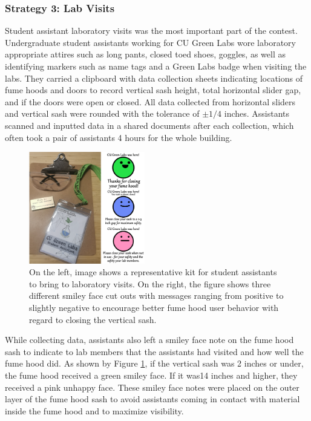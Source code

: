 \documentclass[12pt, twocolumn]{article}
\begin{document}
\subsubsection*{Strategy 3: Lab Visits}\label{Sec:Strategy3}
 Student assistant laboratory visits was the most important part of the contest. Undergraduate student assistants working for CU Green Labs wore laboratory appropriate attires such as long pants, closed toed shoes, goggles, as well as identifying markers such as name tags and a Green Labs badge when visiting the labs. They carried a clipboard with data collection sheets indicating locations of fume hoods and doors to record vertical sash height, total horizontal slider gap, and if the doors were open or closed. All data collected from horizontal sliders and vertical sash were rounded with the tolerance of $\pm 1/4$ inches. Assistants scanned and inputted data in a shared documents after each collection, which often took a pair of assistants 4 hours for the whole building. 

\begin{figure}[ht]	
	\centering
	\includegraphics[width=0.45\textwidth]{Images/Contest_ClipboardAndSmiley.png}
	\caption{On the left, image shows a  representative kit for student assistants to bring to laboratory visits. On the right, the figure shows three different smiley face cut outs with messages ranging from positive to slightly negative to encourage better fume hood user behavior with regard to closing the vertical sash. }
	\label{Fig:ClipboardSmiley}
\end{figure}

While collecting data, assistants also left a smiley face note on the fume hood sash to indicate to lab members that the assistants had visited and how well the fume hood did. As shown by Figure \ref{Fig:ClipboardSmiley}, if the vertical sash was 2 inches or under, the fume hood received a green smiley face. If it was14 inches and higher, they received a pink unhappy face. These smiley face notes were placed on the outer layer of the fume hood sash to avoid assistants coming in contact with material inside the fume hood and to maximize visibility. 
\end{document}
